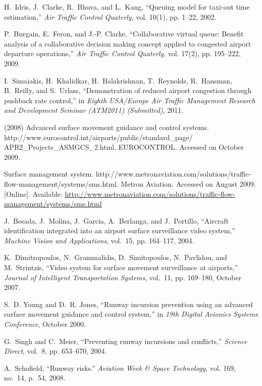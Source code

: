 \documentclass[letterpaper]{article}
\begin{document}
\begin{thebibliography}{10}
H.~Idris, J.~Clarke, R.~Bhuva, and L.~Kang, ``Queuing model for taxi-out time
  estimation,'' \emph{Air Traffic Control Quaterly}, vol. 10(1), pp. 1--22,
  2002.

P.~Burgain, E.~Feron, and J.-P. Clarke, ``Collaborative virtual queue: Benefit
  analysis of a collaborative decision making concept applied to congested
  airport departure operations,'' \emph{Air Traffic Control Quaterly}, vol.
  17(2), pp. 195--222, 2009.

I.~Simaiakis, H.~Khalidkar, H.~Balakrishnan, T.~Reynolds, R.~Hansman,
  B.~Reilly, and S.~Urlass, ``Demonstration of reduced airport congestion
  through pushback rate control,'' in \emph{Eighth USA/Europe Air Traffic
  Management Research and Development Seminar (ATM2011) (Submitted)}, 2011.

(2008) Advanced surface movement guidance and control systems.
  http://www.eurocontrol.int/airports/public/standard\_page/
  APR2\_Projects\_ASMGCS\_2.html. EUROCONTROL. Accessed on October 2009.

\BIBentryALTinterwordspacing
Surface management system.
  http://www.metronaviation.com/solutions/traffic-flow-management/systems/sms.html. Metron Aviation. Accessed on August 2009. [Online]. Available:
  \url{http://www.metronaviation.com/solutions/traffic-flow-management/systems/sms.html}
\BIBentrySTDinterwordspacing

J.~Besada, J.~Molina, J.~Garcia, A.~Berlanga, and J.~Portillo, ``Aircraft
  identification integrated into an airport surface surveillance video
  system,'' \emph{Machine Vision and Applications}, vol.~15, pp. 164--117,
  2004.

K.~Dimitropoulos, N.~Grammalidis, D.~Simitopoulos, N.~Pavlidou, and
  M.~Strintzis, ``Video system for surface movement surveillance at airports,''
  \emph{Journal of Intelligent Transportation Systems}, vol.~11, pp. 169--180,
  October 2007.

S.~D. Young and D.~R. Jones, ``Runway incursion prevention using an advanced
  surface movement guidance and control system,'' in \emph{19th Digital
  Avionics Systems Conference}, October 2000.

G.~Singh and C.~Meier, ``Preventing runway incursions and conflicts,''
  \emph{Science Direct}, vol.~8, pp. 653--670, 2004.

A.~Schofield, ``Runway risks.'' \emph{Aviation Week \& Space Technology}, vol.
  169, no.~14, p.~54, 2008.


\end{thebibliography}
\end{document}

